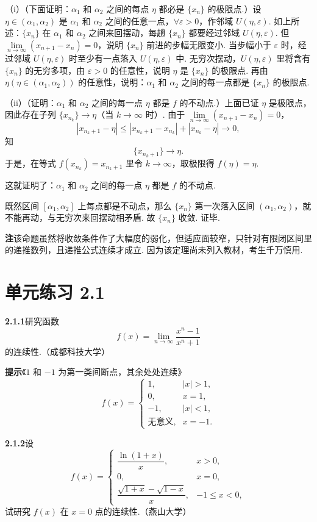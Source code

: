 \documentclass[UTF8, 12pt, fontset=fandol, oneside]{ctexart}
\begin{document}
（i）（下面证明：$\alpha_1$ 和 $\alpha_2$ 之间的每点 $\eta$ 都必是 $\{x_n\}$ 的极限点.）设 $\eta\in(\alpha_1,\alpha_2)$ 是 $\alpha_1$ 和 $\alpha_2$ 之间的任意一点，$\forall\varepsilon>0$，作邻域 $U(\eta,\varepsilon)$. 如上所述：$\{x_n\}$ 在 $\alpha_1$ 和 $\alpha_2$ 之间来回摆动，每趟 $\{x_n\}$ 都要经过邻域 $U(\eta,\varepsilon)$. 但 $\lim\limits_{n\to\infty}(x_{n+1}-x_n)=0$，说明 $\{x_n\}$ 前进的步幅无限变小. 当步幅小于 $\varepsilon$ 时，经过邻域 $U(\eta,\varepsilon)$ 时至少有一点落入 $U(\eta,\varepsilon)$ 中. 无穷次摆动，$U(\eta,\varepsilon)$ 里将含有 $\{x_n\}$ 的无穷多项，由 $\varepsilon>0$ 的任意性，说明 $\eta$ 是 $\{x_n\}$ 的极限点. 再由 $\eta(\eta\in(\alpha_1,\alpha_2))$ 的任意性，说明：$\alpha_1$ 和 $\alpha_2$ 之间的每一点都是 $\{x_n\}$ 的极限点.

（ii）（证明：$\alpha_1$ 和 $\alpha_2$ 之间的每一点 $\eta$ 都是 $f$ 的不动点.）上面已证 $\eta$ 是极限点，因此存在子列 $\{x_{n_k}\}\to\eta$（当 $k\to\infty$ 时）. 由于 $\lim\limits_{n\to\infty}(x_{n+1}-x_n)=0$，
\[
  |x_{n_k+1}-\eta|\le |x_{n_k+1}-x_{n_k}|+|x_{n_k}-\eta|\to0,
\]
知
\[
  \{x_{n_k+1}\}\to\eta.
\]
于是，在等式 $f(x_{n_k})=x_{n_k+1}$ 里令 $k\to\infty$，取极限得 $f(\eta)=\eta$.

这就证明了：$\alpha_1$ 和 $\alpha_2$ 之间的每一点 $\eta$ 都是 $f$ 的不动点.

既然区间 $[\alpha_1,\alpha_2]$ 上每点都是不动点，那么 $\{x_n\}$ 第一次落入区间 $(\alpha_1,\alpha_2)$，就不能再动，与无穷次来回摆动相矛盾. 故 $\{x_n\}$ 收敛. 证毕.

\noindent\textbf{注}\quad 该命题虽然将收敛条件作了大幅度的弱化，但适应面较窄，只针对有限闭区间里的递推数列，且递推公式连续才成立. 因为该定理尚未列入教材，考生千万慎用.

\section*{单元练习 2.1}

\noindent\textbf{2.1.1}\quad 研究函数
\[
  f(x)=\lim_{n\to\infty}\frac{x^n-1}{x^n+1}
\]
的连续性.（成都科技大学）

\noindent\textbf{提示}\quad 《$1$ 和 $-1$ 为第一类间断点，其余处处连续》
\[
  f(x)=
  \begin{cases}
    1, & |x|>1,\\
    0, & x=1,\\
    -1, & |x|<1,\\
    \text{无意义}, & x=-1.
  \end{cases}
\]

\noindent\textbf{2.1.2}\quad 设
\[
  f(x)=
  \begin{cases}
    \dfrac{\ln(1+x)}{x}, & x>0,\\
    0, & x=0,\\
    \dfrac{\sqrt{1+x}-\sqrt{1-x}}{x}, & -1\le x<0,
  \end{cases}
\]
试研究 $f(x)$ 在 $x=0$ 点的连续性.（燕山大学）
\end{document}
